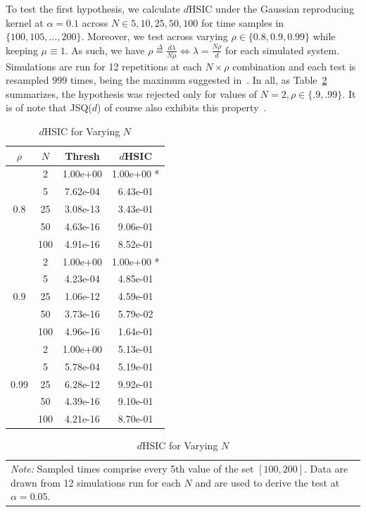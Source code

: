 To test the first hypothesis, we calculate $d$HSIC under the Gaussian reproducing kernel at $\alpha = 0.1$ across $N \in {5, 10, 25, 50, 100}$ for time samples
in $\{100, 105, \dots, 200\}$.
Moreover, we test across varying $\rho \in \{0.8, 0.9, 0.99\}$ while keeping $\mu \equiv 1$.
As such, we have $\rho \overset{\Delta}= \frac{d\lambda}{N\mu} \iff \lambda = \frac{N \rho}{d}$ for each simulated system.
Simulations are run for 12 repetitions at each $N\times\rho$ combination and each test is resampled $999$ times, being the maximum suggested in~\cite{jointindep}.
In all, as Table~\ref{tab:reg} summarizes, the hypothesis was rejected only for values of $N = 2, \rho \in \{.9,.99\}$.
It is of note that JSQ($d$) of course also exhibits this property~\cite{bramson_asymptotic_2012}.
\begin{table}
    \centering
    \caption{$d$HSIC for Varying $N$}
    \label{tab:reg}
    \begin{tabular}{|c|c|c|c|}
\hline
$\rho$ & $N$ & Thresh & $d$HSIC \\
\hline
\hline
 & 2 & 1.00e+00 & 1.00e+00 * \\
 & 5 & 7.62e-04 & 6.43e-01  \\
0.8 & 25 & 3.08e-13 & 3.43e-01  \\
 & 50 & 4.63e-16 & 9.06e-01  \\
 & 100 & 4.91e-16 & 8.52e-01  \\
\hline
 & 2 & 1.00e+00 & 1.00e+00 * \\
 & 5 & 4.23e-04 & 4.85e-01  \\
0.9 & 25 & 1.06e-12 & 4.59e-01  \\
 & 50 & 3.73e-16 & 5.79e-02  \\
 & 100 & 4.96e-16 & 1.64e-01  \\
\hline
 & 2 & 1.00e+00 & 5.13e-01  \\
 & 5 & 5.78e-04 & 5.19e-01  \\
0.99 & 25 & 6.28e-12 & 9.92e-01  \\
 & 50 & 4.39e-16 & 9.10e-01  \\
 & 100 & 4.21e-16 & 8.70e-01  \\
\hline
    \end{tabular}

    \begin{tabular}{p{10cm}}
        \textit{Note:} Sampled times comprise every 5th value of the set $[100,200]$.
        Data are drawn from 12 simulations run for each $N$ and are used to derive the test at $\alpha = 0.05$.
    \end{tabular}
\end{table}


